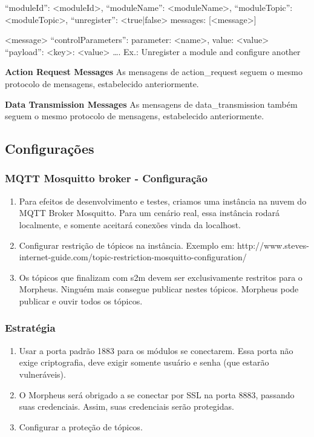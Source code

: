  {
            “moduleId”: \textless moduleId\textgreater ,
            “moduleName”: \textless moduleName\textgreater ,
            “moduleTopic”: \textless moduleTopic\textgreater ,
“unregister”: \textless true|false\textgreater
	 messages: [\textless message\textgreater ]
         }

\textless message\textgreater
“controlParameters”:
{
parameter: \textless name\textgreater ,
value: \textless value\textgreater
}
“payload”: {
\textless key\textgreater : \textless value\textgreater
….
}
Ex.: Unregister a module and configure another


\textbf{Action Request Messages}
As mensagens de action\_request seguem o mesmo protocolo de mensagens, estabelecido anteriormente.

\textbf{Data Transmission Messages}
As mensagens de data\_transmission também seguem o mesmo protocolo de mensagens, estabelecido anteriormente.

\subsection{Configurações}

\subsubsection{MQTT Mosquitto broker - Configuração}

\begin{enumerate}
\item Para efeitos de desenvolvimento e testes, criamos uma instância na nuvem do MQTT Broker Mosquitto. Para um cenário real, essa instância rodará localmente, e somente aceitará conexões vinda da localhost.
\item Configurar restrição de tópicos na instância. Exemplo em: http://www.steves-internet-guide.com/topic-restriction-mosquitto-configuration/
\item Os tópicos que finalizam com s2m devem ser exclusivamente restritos para o Morpheus. Ninguém mais consegue publicar nestes tópicos. Morpheus pode publicar e ouvir todos os tópicos.
\end{enumerate}

\subsubsection{Estratégia}
\begin{enumerate}
\item Usar a porta padrão 1883 para os módulos se conectarem. Essa porta não exige criptografia, deve exigir somente usuário e senha (que estarão vulneráveis).
\item O Morpheus será obrigado a se conectar por SSL na porta 8883, passando suas credenciais. Assim, suas credenciais serão protegidas.
\item Configurar a proteção de tópicos.
\end{enumerate}


